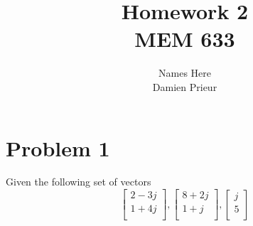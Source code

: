 \documentclass{article}
\author{Names Here \\ Damien Prieur}
\title{Homework 2\\ MEM 633}
\date{}
\begin{document}
\maketitle

\section*{Problem 1}
Given the following set of vectors
$$
\begin{bmatrix}
2-3j \\
1+4j \\
\end{bmatrix}
,
\begin{bmatrix}
8+2j \\
1+j \\
\end{bmatrix}
,
\begin{bmatrix}
j \\
5 \\
\end{bmatrix}
$$
\end{document}
